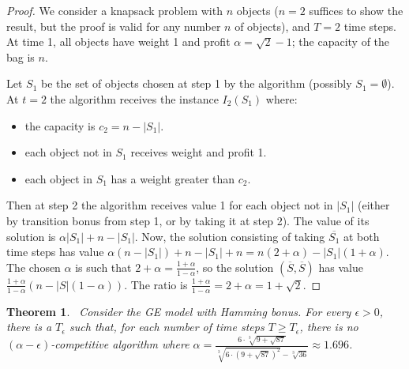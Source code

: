 \documentclass[a4paper]{book}
\newtheorem{theorem}{Theorem}[chapter]
\newtheorem{proof}{\noindent{\bf Proof.} }
\begin{document}
\begin{proof}
We consider a knapsack problem with $n$ objects ($n=2$ suffices to show the result, but the proof is valid for any number $n$ of objects), and $T=2$ time steps. At time 1, all objects have weight 1 and profit $\alpha=\sqrt{2}-1$; the capacity of the bag is $n$. 

Let $S_1$ be the set of objects chosen at step 1 by the algorithm (possibly $S_1=\emptyset$). At $t=2$ the algorithm receives the instance $I_2(S_1)$ where:
\begin{itemize}
	\item the capacity is $c_2=n-|S_1|$.
	\item each object not in $S_1$ receives weight and profit 1.
	\item each object in $S_1$ has a weight greater than $c_2$.
\end{itemize}
Then at step 2 the algorithm receives value 1 for each object not in $|S_1|$ (either by transition bonus from step 1, or by taking it at step 2). The value of its solution is $\alpha |S_1|+n-|S_1|$. Now, the solution consisting of taking $\overline{S_1}$ at both time steps has value $\alpha(n-|S_1|)+n-|S_1|+n=n(2+\alpha)-|S_1|(1+\alpha)$. The chosen $\alpha$ is such that $2+\alpha=\frac{1+\alpha}{1-\alpha}$, so the solution $(\overline{S},\overline{S})$ has value $\frac{1+\alpha}{1-\alpha}\left(n-|S|(1-\alpha)\right)$. The ratio is $\frac{1+\alpha}{1-\alpha}=2+\alpha=1+\sqrt{2}$. %
\end{proof}

\begin{theorem}~\label{th:lwasymp}
	Consider the GE model with Hamming bonus. For every $\epsilon>0$, there is a $T_\epsilon$ such that, for each number of time steps $T\geq T_\epsilon$, there is no $(\alpha-\epsilon)$-competitive algorithm where $\alpha= \frac{6\cdot\sqrt[3]{9 + \sqrt{87}}}{\sqrt[3]{6\cdot(9 + \sqrt{87})^2}-\sqrt[3]{36}}\approx1.696$.%
\end{theorem}
\end{document}
